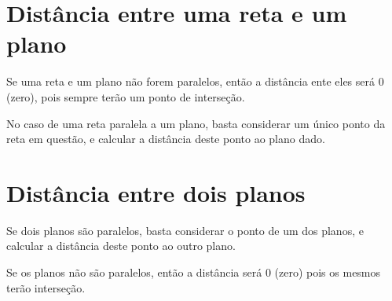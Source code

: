 \section{Distância entre uma reta e um plano}

Se uma reta e um plano não forem paralelos, então a distância ente eles será $0$ (zero), pois sempre terão um ponto de interseção.

No caso de uma reta paralela a um plano, basta considerar um único ponto da reta em questão, e calcular a distância deste ponto ao plano dado.

\section{Distância entre dois planos}

Se dois planos são paralelos, basta considerar o ponto de um dos planos, e calcular a distância deste ponto ao outro plano.

Se os planos não são paralelos, então a distância será $0$ (zero) pois os mesmos terão interseção.